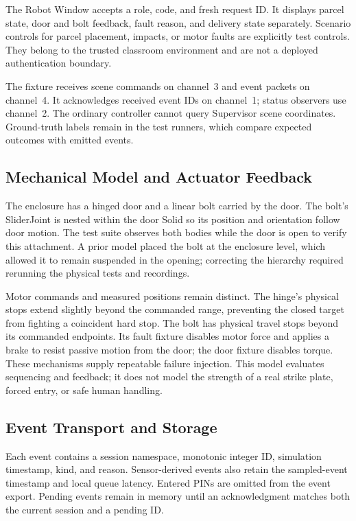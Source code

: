 \documentclass[conference,letterpaper]{IEEEtran}
\begin{document}
The Robot Window accepts a role, code, and fresh request ID. It displays parcel state, door and bolt feedback, fault reason, and delivery state separately. Scenario controls for parcel placement, impacts, or motor faults are explicitly test controls. They belong to the trusted classroom environment and are not a deployed authentication boundary.

The fixture receives scene commands on channel~3 and event packets on channel~4. It acknowledges received event IDs on channel~1; status observers use channel~2. The ordinary controller cannot query Supervisor scene coordinates. Ground-truth labels remain in the test runners, which compare expected outcomes with emitted events.

\subsection{Mechanical Model and Actuator Feedback}
The enclosure has a hinged door and a linear bolt carried by the door. The bolt's SliderJoint is nested within the door Solid so its position and orientation follow door motion. The test suite observes both bodies while the door is open to verify this attachment. A prior model placed the bolt at the enclosure level, which allowed it to remain suspended in the opening; correcting the hierarchy required rerunning the physical tests and recordings.

Motor commands and measured positions remain distinct. The hinge's physical stops extend slightly beyond the commanded range, preventing the closed target from fighting a coincident hard stop. The bolt has physical travel stops beyond its commanded endpoints. Its fault fixture disables motor force and applies a brake to resist passive motion from the door; the door fixture disables torque. These mechanisms supply repeatable failure injection. This model evaluates sequencing and feedback; it does not model the strength of a real strike plate, forced entry, or safe human handling.

\subsection{Event Transport and Storage}
Each event contains a session namespace, monotonic integer ID, simulation timestamp, kind, and reason. Sensor-derived events also retain the sampled-event timestamp and local queue latency. Entered PINs are omitted from the event export. Pending events remain in memory until an acknowledgment matches both the current session and a pending ID.
\end{document}
